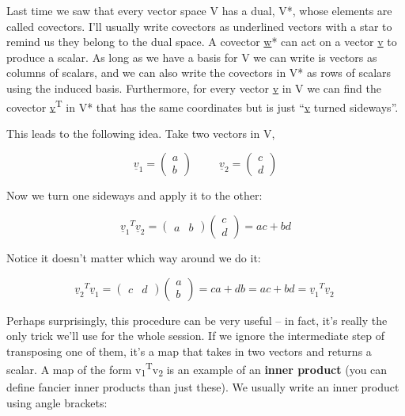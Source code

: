 \documentclass[oneside,english]{amsbook}
\numberwithin{section}{chapter}
\theoremstyle{plain}
\theoremstyle{definition}
\begin{document}
Last time we saw that every vector space V has a dual, V*, whose
elements are called covectors. I'll usually write covectors as
underlined vectors with a star to remind us they belong to the dual
space. A covector \ul{w}* can act on a vector \ul{v} to produce a
scalar. As long as we have a basis for V we can write is vectors as
columns of scalars, and we can also write the covectors in V* as rows of
scalars using the induced basis. Furthermore, for every vector \ul{v} in
V we can find the covector \ul{v}\textsuperscript{T} in V* that has the
same coordinates but is just ``\ul{v} turned sideways''.

This leads to the following idea. Take two vectors in V,

\[{\underline{v}}_{1} = \begin{pmatrix}
	a \\
	b
\end{pmatrix}\ \ \ \ \ \ \ \ \ \ \ {\underline{v}}_{2} = \begin{pmatrix}
	c \\
	d
\end{pmatrix}\]

Now we turn one sideways and apply it to the other:

\[{{\underline{v}}_{1}}^{T}{\underline{v}}_{2} = \begin{pmatrix}
	a & b
\end{pmatrix}\begin{pmatrix}
	c \\
	d
\end{pmatrix} = ac + bd\]

Notice it doesn't matter which way around we do it:

\[{{\underline{v}}_{2}}^{T}{\underline{v}}_{1} = \begin{pmatrix}
	c & d
\end{pmatrix}\begin{pmatrix}
	a \\
	b
\end{pmatrix} = ca + db = ac + bd = {{\underline{v}}_{1}}^{T}{\underline{v}}_{2}\ \]

Perhaps surprisingly, this procedure can be very useful -- in fact, it's
really the only trick we'll use for the whole session. If we ignore the
intermediate step of transposing one of them, it's a map that takes in
two vectors and returns a scalar. A map of the form
v\textsubscript{1}\textsuperscript{T}v\textsubscript{2} is an example of
an \textbf{inner product} (you can define fancier inner products than
just these). We usually write an inner product using angle brackets:
\end{document}
